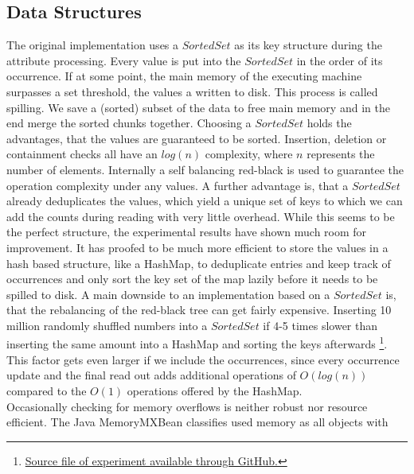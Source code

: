 \subsection{Data Structures}
The original implementation uses a $SortedSet$ as its key structure during the attribute processing. Every value is put into the $SortedSet$ in the order of its occurrence. If at some point, the main memory of the executing machine surpasses a set threshold, the values a written to disk. This process is called spilling. We save a (sorted) subset of the data to free main memory and in the end merge the sorted chunks together. Choosing a $SortedSet$ holds the advantages, that the values are guaranteed to be sorted. Insertion, deletion or containment checks all have an $log(n)$ complexity, where $n$ represents the number of elements. Internally a self balancing red-black is used to guarantee the operation complexity under any values. A further advantage is, that a $SortedSet$ already deduplicates the values, which yield a unique set of keys to which we can add the counts during reading with very little overhead.
While this seems to be the perfect structure, the experimental results have shown much room for improvement. It has proofed to be much more efficient to store the values in a hash based structure, like a HashMap, to deduplicate entries and keep track of occurrences and only sort the key set of the map lazily before it needs to be spilled to disk. A main downside to an implementation based on a $SortedSet$ is, that the rebalancing of the red-black tree can get fairly expensive. Inserting 10 million randomly shuffled numbers into a $SortedSet$ if 4-5 times slower than inserting the same amount into a HashMap and sorting the keys afterwards \footnote{\href{https://github.com/Jakob-L-M/partial-inclusion-dependencies/blob/main/experiments/src/DataStructures.java}{Source file of experiment available through GitHub.}}. This factor gets even larger if we include the occurrences, since every occurrence update and the final read out adds additional operations of $O(log(n))$ compared to the $O(1)$ operations offered by the HashMap. \\

\noindent
Occasionally checking for memory overflows is neither robust nor resource efficient. The Java MemoryMXBean classifies used memory as all objects with 